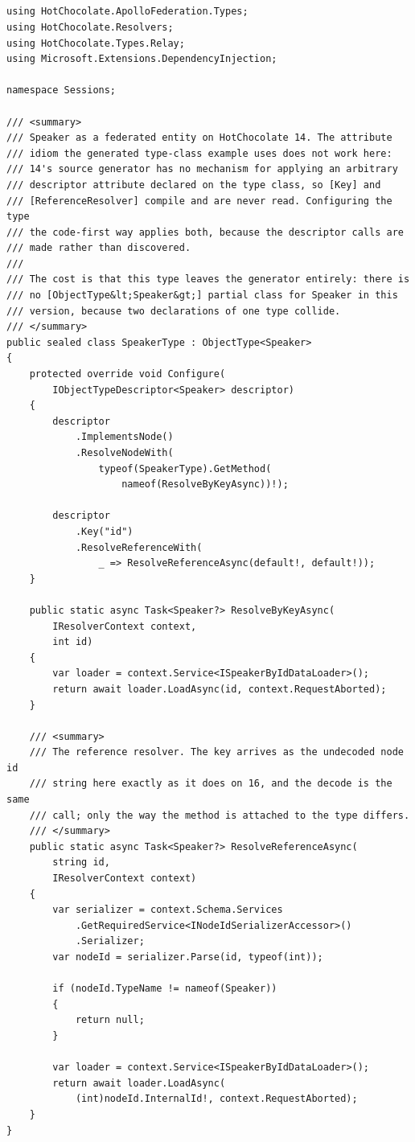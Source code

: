 \subsection*{}
\begin{verbatim}
using HotChocolate.ApolloFederation.Types;
using HotChocolate.Resolvers;
using HotChocolate.Types.Relay;
using Microsoft.Extensions.DependencyInjection;

namespace Sessions;

/// <summary>
/// Speaker as a federated entity on HotChocolate 14. The attribute
/// idiom the generated type-class example uses does not work here:
/// 14's source generator has no mechanism for applying an arbitrary
/// descriptor attribute declared on the type class, so [Key] and
/// [ReferenceResolver] compile and are never read. Configuring the type
/// the code-first way applies both, because the descriptor calls are
/// made rather than discovered.
///
/// The cost is that this type leaves the generator entirely: there is
/// no [ObjectType&lt;Speaker&gt;] partial class for Speaker in this
/// version, because two declarations of one type collide.
/// </summary>
public sealed class SpeakerType : ObjectType<Speaker>
{
    protected override void Configure(
        IObjectTypeDescriptor<Speaker> descriptor)
    {
        descriptor
            .ImplementsNode()
            .ResolveNodeWith(
                typeof(SpeakerType).GetMethod(
                    nameof(ResolveByKeyAsync))!);

        descriptor
            .Key("id")
            .ResolveReferenceWith(
                _ => ResolveReferenceAsync(default!, default!));
    }

    public static async Task<Speaker?> ResolveByKeyAsync(
        IResolverContext context,
        int id)
    {
        var loader = context.Service<ISpeakerByIdDataLoader>();
        return await loader.LoadAsync(id, context.RequestAborted);
    }

    /// <summary>
    /// The reference resolver. The key arrives as the undecoded node id
    /// string here exactly as it does on 16, and the decode is the same
    /// call; only the way the method is attached to the type differs.
    /// </summary>
    public static async Task<Speaker?> ResolveReferenceAsync(
        string id,
        IResolverContext context)
    {
        var serializer = context.Schema.Services
            .GetRequiredService<INodeIdSerializerAccessor>()
            .Serializer;
        var nodeId = serializer.Parse(id, typeof(int));

        if (nodeId.TypeName != nameof(Speaker))
        {
            return null;
        }

        var loader = context.Service<ISpeakerByIdDataLoader>();
        return await loader.LoadAsync(
            (int)nodeId.InternalId!, context.RequestAborted);
    }
}
\end{verbatim}

